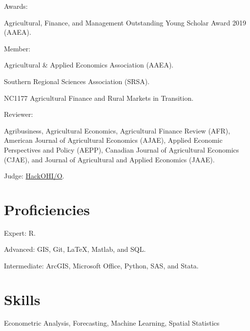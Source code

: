 \documentclass[letterpaper]{article}
\renewenvironment{itemize}{
  \begin{list}{}{
    \setlength{\leftmargin}{1.5em}
  }
}{
  \end{list}
}
\begin{document}
\begin{itemize}
\item Awards:
\begin{itemize}
  \item Agricultural, Finance, and Management Outstanding Young Scholar Award 2019 (AAEA).
  \end{itemize}
\item Member:
  \begin{itemize}
  \item Agricultural \& Applied Economics Association (AAEA).
  \item Southern Regional Sciences Association (SRSA).
  \item NC1177 Agricultural Finance and Rural Markets in Transition.
  \end{itemize}
\item Reviewer:
  \begin{itemize}
  \item Agribusiness, Agricultural Economics, Agricultural Finance Review (AFR), American Journal of Agricultural Economics (AJAE), Applied Economic Perspectives and Policy (AEPP), Canadian Journal of Agricultural Economics (CJAE), and Journal of Agricultural and Applied Economics (JAAE).
  \end{itemize}
\item Judge: \href{http://hack.osu.edu/2016/}{HackOHI/O}.
\end{itemize}


\section*{Proficiencies}

\begin{itemize}
\item Expert: R.
\item Advanced: GIS, Git, \LaTeX, Matlab, and SQL.
\item Intermediate: ArcGIS, Microsoft Office, Python, SAS, and Stata.
\end{itemize}

\section*{Skills}
\begin{itemize}
\item Econometric Analysis, Forecasting, Machine Learning, Spatial Statistics
\end{itemize}
\end{document}
